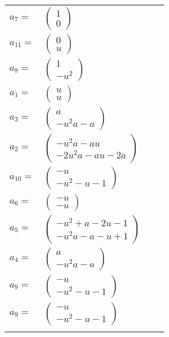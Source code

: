 \documentclass[1p]{elsarticle_modified}
\theoremstyle{definition}
\begin{document}
\begin{tabular}{m{7pt} m{180pt} m{7pt} m{180pt} }
\flushright $a_{7}=$&$\begin{pmatrix}1\\0\end{pmatrix}$ \\
\flushright $a_{11}=$&$\begin{pmatrix}0\\u\end{pmatrix}$ \\
\flushright $a_{8}=$&$\begin{pmatrix}1\\- u^2\end{pmatrix}$ \\
\flushright $a_{1}=$&$\begin{pmatrix}u\\u\end{pmatrix}$ \\
\flushright $a_{3}=$&$\begin{pmatrix}a\\- u^2 a- a\end{pmatrix}$ \\
\flushright $a_{2}=$&$\begin{pmatrix}- u^2 a- a u\\-2 u^2 a- a u-2 a\end{pmatrix}$ \\
\flushright $a_{10}=$&$\begin{pmatrix}- u\\- u^2- u-1\end{pmatrix}$ \\
\flushright $a_{6}=$&$\begin{pmatrix}- u\\- u\end{pmatrix}$ \\
\flushright $a_{5}=$&$\begin{pmatrix}- u^2+a-2 u-1\\- u^2 a- a- u+1\end{pmatrix}$ \\
\flushright $a_{4}=$&$\begin{pmatrix}a\\- u^2 a- a\end{pmatrix}$ \\
\flushright $a_{9}=$&$\begin{pmatrix}- u\\- u^2- u-1\end{pmatrix}$\\ \flushright $a_{9}=$&$\begin{pmatrix}- u\\- u^2- u-1\end{pmatrix}$\\&\end{tabular}
\end{document}

